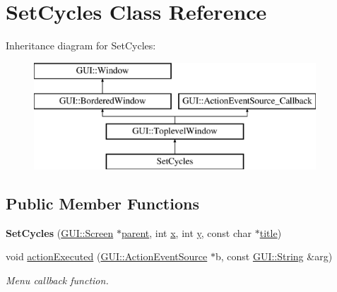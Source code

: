 \hypertarget{classSetCycles}{\section{Set\-Cycles Class Reference}
\label{classSetCycles}
}
Inheritance diagram for Set\-Cycles\-:\begin{figure}[H]
\begin{center}
\leavevmode
\includegraphics[height=4.000000cm]{classSetCycles}
\end{center}
\end{figure}
\subsection*{Public Member Functions}
\begin{DoxyCompactItemize}
\item 
\hypertarget{classSetCycles_a4eb745761f106c300a53f371b78c5254}{{\bfseries Set\-Cycles} (\hyperlink{classGUI_1_1Screen}{G\-U\-I\-::\-Screen} $\ast$\hyperlink{classGUI_1_1Window_a2e593ff65e7702178d82fe9010a0b539}{parent}, int \hyperlink{classGUI_1_1Window_a6ca6a80ca00c9e1d8ceea8d3d99a657d}{x}, int \hyperlink{classGUI_1_1Window_a0ee8e923aff2c3661fc2e17656d37adf}{y}, const char $\ast$\hyperlink{classGUI_1_1ToplevelWindow_a04de191f9a57b5b584657866a4ac6843}{title})}\label{classSetCycles_a4eb745761f106c300a53f371b78c5254}

\item 
\hypertarget{classSetCycles_af44270f3268432309501b4918facf28a}{void \hyperlink{classSetCycles_af44270f3268432309501b4918facf28a}{action\-Executed} (\hyperlink{classGUI_1_1ActionEventSource}{G\-U\-I\-::\-Action\-Event\-Source} $\ast$b, const \hyperlink{classGUI_1_1String}{G\-U\-I\-::\-String} \&arg)}\label{classSetCycles_af44270f3268432309501b4918facf28a}

\begin{DoxyCompactList}\small\item\em Menu callback function. \end{DoxyCompactList}\end{DoxyCompactItemize}
